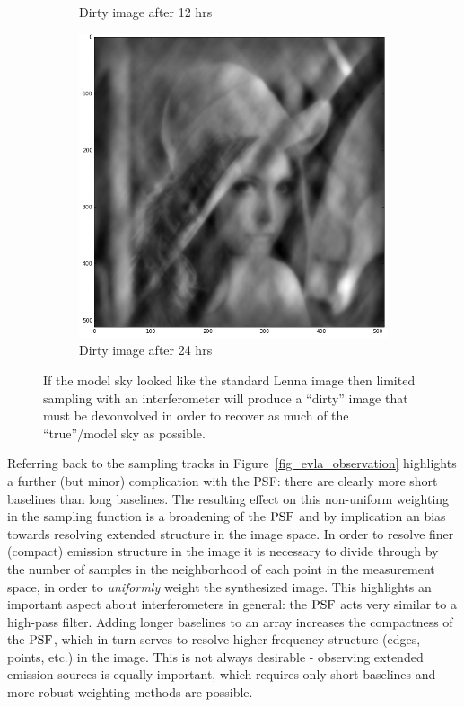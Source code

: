 \begin{figure}[ht!]
\begin{mdframed}
\begin{subfigure}[b]{0.34\textwidth}
  \caption{Dirty image after 12 hrs}
 \end{subfigure}
 \begin{subfigure}[b]{0.34\textwidth}
  \includegraphics[width=\textwidth]{images/evla_lena_observation/24hr.png}
  \caption{Dirty image after 24 hrs}
 \end{subfigure}
 \caption[Effect of observation time on dirty image synthesis]{If the model sky looked like the standard Lenna image then limited sampling with an interferometer will produce a ``dirty'' image that
 must be devonvolved in order to recover as much of the ``true''/model sky as possible.}
  \label{fig_model_convolution}
 \end{mdframed}
\end{figure}

Referring back to the sampling tracks in Figure~\ref{fig_evla_observation} highlights a further (but minor) complication with the PSF: there are clearly more short baselines than long baselines. The resulting effect on this non-uniform
weighting in the sampling function is a broadening of the $\textrm{PSF}$ and by implication an bias towards resolving extended structure in the image space. In order to resolve finer (compact) emission structure in the image
it is necessary to divide through by the number of samples in the neighborhood of each point in the measurement space, in order to \emph{uniformly} weight the synthesized image. This highlights an important aspect about
interferometers in general: the $\textrm{PSF}$ acts very similar to a high-pass filter. Adding longer baselines to an array increases the compactness of the $\textrm{PSF}$, which in turn serves to resolve higher frequency structure (edges, points, etc.)
in the image. This is not always desirable - observing extended emission sources is equally important, which requires only short baselines and more robust weighting methods are possible.

